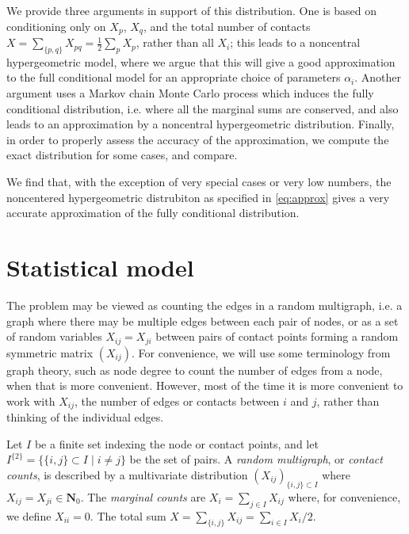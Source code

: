 \documentclass{myaptpub}%
\newcommand\term[1]{\textit{#1}}
\newcommand\NN{\mathbf{N}}
\newcommand\pair[1]{{#1^{\{2\}}}}
\newcommand\inpair[1]{\subset #1}
\begin{document}
We provide three arguments in support of this distribution. One is based on conditioning only on $X_p$, $X_q$, and the total number of contacts $X=\sum_{\{p,q\}}X_{pq}=\frac{1}{2}\sum_p X_p$, rather than all $X_i$; this leads to a noncentral hypergeometric model, where we argue that this will give a good approximation to the full conditional model for an appropriate choice of parameters $\alpha_i$. Another argument uses a Markov chain Monte Carlo process which induces the fully conditional distribution, i.e. where all the marginal sums are conserved, and also leads to an approximation by a noncentral hypergeometric distribution. Finally, in order to properly assess the accuracy of the approximation, we compute the exact distribution for some cases, and compare.

We find that, with the exception of very special cases or very low numbers, the noncentered hypergeometric distrubiton as specified in \eqref{eq:approx} gives a very accurate approximation of the fully conditional distribution.


\section{Statistical model}

The problem may be viewed as counting the edges in a random multigraph, i.e. a graph where there may be multiple edges between each pair of nodes, or as a set of random variables $X_{ij}=X_{ji}$ between pairs of contact points forming a random symmetric matrix $(X_{ij})$. For convenience, we will use some terminology from graph theory, such as node degree to count the number of edges from a node, when that is more convenient. However, most of the time it is more convenient to work with $X_{ij}$, the number of edges or contacts between $i$ and $j$, rather than thinking of the individual edges.

\begin{definition}\label{def:count}
Let $I$ be a finite set indexing the node or contact points, and let $\pair{I}=\{\{i,j\}\inpair{I}\mid i\not=j\}$ be the set of pairs.
A \term{random multigraph}, or \term{contact counts}, is described by a multivariate distribution $(X_{ij})_{\{i,j\}\inpair{I}}$ where $X_{ij}=X_{ji}\in\NN_0$. The \term{marginal counts} are $X_i=\sum_{j\in I} X_{ij}$ where, for convenience, we define $X_{ii}=0$.
The total sum $X=\sum_{\{i,j\}}X_{ij}=\sum_{i\in I}X_i/2$.
\end{definition}
\end{document}
